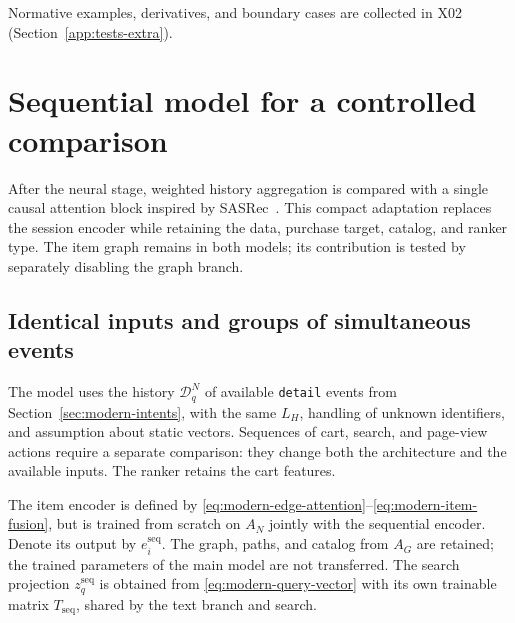 \documentclass[12pt,a4paper]{article}
\newcommand{\code}[1]{{\ttfamily\small\nolinkurl{#1}}}
\theoremstyle{plainru}
\begin{document}
Normative examples, derivatives, and boundary cases are collected
in X02 (Section~\ref{app:tests-extra}).

\section{Sequential model for a controlled comparison}
\label{sec:sequence-control}
\label{sec:sequence-overview}

After the neural stage, weighted history aggregation is compared
with a single causal attention block inspired by SASRec~\cite{sasrec2018}.
This compact adaptation replaces the session encoder while retaining the data,
purchase target, catalog, and ranker type. The item graph remains
in both models; its contribution is tested by separately disabling the graph branch.

\subsection{Identical inputs and groups of simultaneous events}
\label{sec:sequence-input}

The model uses the history $\mathcal D_q^N$ of available \code{detail} events
from Section~\ref{sec:modern-intents}, with the same $L_H$, handling
of unknown identifiers, and assumption about static vectors.
Sequences of cart, search, and page-view actions
require a separate comparison: they change both the architecture and the available inputs.
The ranker retains the cart features.

The item encoder is defined by
\eqref{eq:modern-edge-attention}--\eqref{eq:modern-item-fusion},
but is trained from scratch on $A_N$ jointly with the sequential encoder.
Denote its output by $e_i^{\mathrm{seq}}$.
The graph, paths, and catalog from $A_G$ are retained; the trained parameters
of the main model are not transferred. The search projection $z_q^{\mathrm{seq}}$ is obtained from
\eqref{eq:modern-query-vector} with its own trainable matrix
$T_{\mathrm{seq}}$, shared by the text branch and search.
\end{document}
